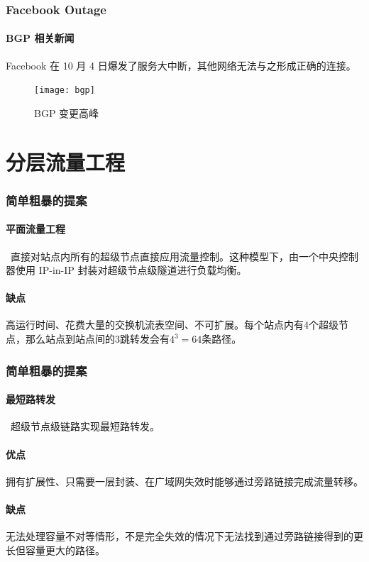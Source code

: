 \begin{frame}[plain]
    \frametitle{Facebook Outage}
    \framesubtitle{BGP 相关新闻}
    Facebook 在 10 月 4 日爆发了服务大中断，其他网络无法与之形成正确的连接。
    \begin{figure}
        \centering
        \texttt{[image: bgp]}
        \caption{BGP 变更高峰}
    \end{figure}
\end{frame}

\section{分层流量工程}

\begin{frame}
    \frametitle{简单粗暴的提案}
    \framesubtitle{平面流量工程}
    ~直接对站点内所有的超级节点直接应用流量控制。这种模型下，由一个中央控制器使用 IP-in-IP 封装对超级节点级隧道进行负载均衡。

    \paragraph{缺点} 高运行时间、花费大量的交换机流表空间、不可扩展。每个站点内有4个超级节点，那么站点到站点间的3跳转发会有$4^3=64$条路径。
\end{frame}

\begin{frame}
    \frametitle{简单粗暴的提案}
    \framesubtitle{最短路转发}

    ~超级节点级链路实现最短路转发。

    \paragraph{优点}拥有扩展性、只需要一层封装、在广域网失效时能够通过\alert{旁路链接}完成流量转移。

    \paragraph{缺点}无法处理容量不对等情形，不是完全失效的情况下无法找到通过\alert{旁路链接}得到的更长但容量更大的路径。
    \hyperlink{asym<3>}{}
\end{frame}

